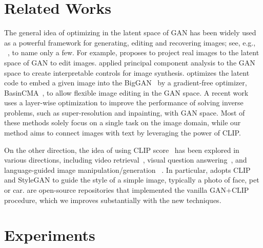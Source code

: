 \documentclass[10pt,twocolumn,letterpaper]{article}
\begin{document}
\section{Related Works}
The general idea of optimizing in the latent space of GAN has been widely used as a powerful framework 
for generating, editing and recovering images; see, e.g.,  
~\cite{zhu2016generative, harkonen2020ganspace, huh2020transforming, abdal2019image2stylegan}, to name only a few.  
For example, \cite{zhu2016generative} proposes to project real images to the latent space of GAN to edit images. 
\cite{harkonen2020ganspace} applied principal component analysis to the GAN space 
to create interpretable controls for image synthesis. \cite{huh2020transforming} optimizes the latent code to embed a given image into the BigGAN~\cite{brock2018large} by a gradient-free optimizer, BasinCMA~\cite{bau2019seeing, wampler2009optimal}, to allow flexible image editing in the GAN space. 
A recent work~\cite{daras2021intermediate} uses a layer-wise optimization to improve the performance of solving inverse problems, such as super-resolution and inpainting, with GAN space.
Most of these methods solely focus on a single task on the image domain, while our method aims to connect images with text by leveraging the power of CLIP. 


On the other direction, the idea of using CLIP score~\cite{radford2021learning} has been explored in various directions, 
including video retrieval~\cite{luo2021clip4clip}, visual question answering~\cite{shen2021much}, and language-guided image manipulation/generation
~\cite{galatolo2021generating, bigsleep, VQGANCLIP, patashnik2021styleclip}. 
In particular, \cite{patashnik2021styleclip} adopts CLIP and StyleGAN to guide the style of a simple image, typically a photo of face, pet or car.  
\cite{bigsleep, VQGANCLIP, galatolo2021generating} are open-source repositories that implemented the vanilla GAN+CLIP procedure, which we improves substantially with the new techniques. 



%
 
\section{Experiments}
\end{document}

